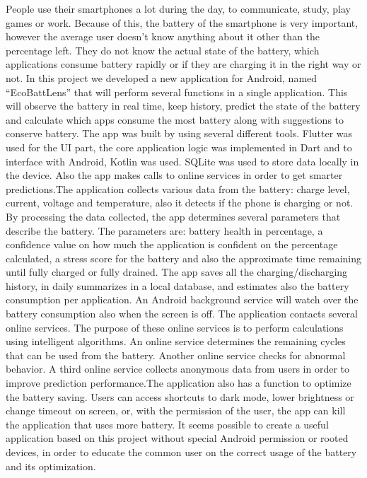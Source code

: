 \documentclass[12pt,a4paper]{report}
\begin{document}
People use their smartphones a lot during the day, to communicate, study, play games or work. Because of this, the battery of the smartphone is very important, however the average user doesn't know anything about it other than the percentage left. They do not know the actual state of the battery, which applications consume battery rapidly or if they are charging it in the right way or not. In this project we developed a new application for Android, named ``EcoBattLens'' that will perform several functions in a single application. This will observe the battery in real time, keep history, predict the state of the battery and calculate which apps consume the most battery along with suggestions to conserve battery. The app was built by using several different tools. Flutter was used for the UI part, the core application logic was implemented in Dart and to interface with Android, Kotlin was used. SQLite was used to store data locally in the device. Also the app makes calls to online services in order to get smarter predictions.The application collects various data from the battery: charge level, current, voltage and temperature, also it detects if the phone is charging or not. By processing the data collected, the app determines several parameters that describe the battery. The parameters are: battery health in percentage, a confidence value on how much the application is confident on the percentage calculated, a stress score for the battery and also the approximate time remaining until fully charged or fully drained. The app saves all the charging/discharging history, in daily summarizes in a local database, and estimates also the battery consumption per application. An Android background service will watch over the battery consumption also when the screen is off. The application contacts several online services. The purpose of these online services is to perform calculations using intelligent algorithms. An online service determines the remaining cycles that can be used from the battery. Another online service checks for abnormal behavior. A third online service collects anonymous data from users in order to improve prediction performance.The application also has a function to optimize the battery saving. Users can access shortcuts to dark mode, lower brightness or change timeout on screen, or, with the permission of the user, the app can kill the application that uses more battery. It seems possible to create a useful application based on this project without special Android permission or rooted devices, in order to educate the common user on the correct usage of the battery and its optimization.
\end{document}
